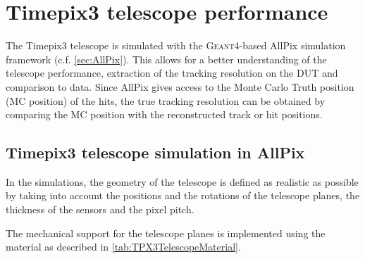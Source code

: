 \section{Timepix3 telescope performance}
\label{sec:telescopePerformance}

The Timepix3 telescope is simulated with the \textsc{Geant4}-based
AllPix simulation framework (c.f. \cref{sec:AllPix}). This allows for
a better understanding of the telescope performance, extraction of the
tracking resolution on the DUT and comparison to data. Since AllPix
gives access to the Monte Carlo Truth position (MC position) of the
hits, the true tracking resolution can be obtained by comparing the MC
position with the reconstructed track or hit positions.

\subsection{Timepix3 telescope simulation in AllPix}
In the simulations, the geometry of the telescope is defined as
realistic as possible by taking into account the positions and the
rotations of the telescope planes, the thickness of the sensors and
the pixel pitch. 

The mechanical support for the telescope planes is implemented using
the material as described in \cref{tab:TPX3TelescopeMaterial}.



